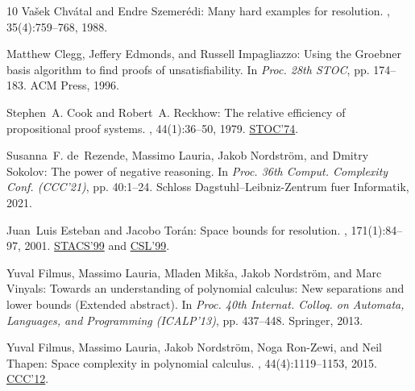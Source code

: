 \begin{thebibliography}{10}
{\sc Va{\v{s}}ek Chv{\'a}tal and Endre Szemer{\'e}di}: Many hard examples for
  resolution.
, 35(4):759--768, 1988.
\newblock [\epfmtdoi{10.1145/48014.48016}]

{\sc Matthew Clegg, Jeffery Edmonds, and Russell Impagliazzo}: Using the
  {Groebner} basis algorithm to find proofs of unsatisfiability.
\newblock In {\em Proc. 28th STOC}, pp. 174--183. ACM Press, 1996.
\newblock [\epfmtdoi{10.1145/237814.237860}]

{\sc Stephen~A. Cook and Robert~A. Reckhow}: The relative efficiency of
  propositional proof systems.
, 44(1):36--50, 1979.
\newblock \prelim \href{https://dl.acm.org/doi/10.1145/800119.803893}{STOC'74}.
\newblock [\epfmtdoi{10.2307/2273702}]

{\sc Susanna~F. de~Rezende, Massimo Lauria, Jakob Nordstr\"om, and Dmitry
  Sokolov}: The power of negative reasoning.
\newblock In {\em Proc. 36th Comput. Complexity Conf. (CCC'21)}, pp. 40:1--24.
  Schloss Dagstuhl--Leibniz-Zentrum fuer Informatik, 2021.

{\sc Juan~Luis Esteban and Jacobo Tor\'an}: Space bounds for resolution.
, 171(1):84--97, 2001.
\newblock \prelim \href{https://doi.org/10.1007/3-540-49116-3\_52}{STACS'99}
  and \href{https://doi.org/10.1007/3-540-48168-0\_26}{CSL'99}.

{\sc Yuval Filmus, Massimo Lauria, Mladen Mik\v{s}a, Jakob Nordstr\"om, and
  Marc Vinyals}: Towards an understanding of polynomial calculus: {N}ew
  separations and lower bounds ({E}xtended abstract).
\newblock In {\em Proc. 40th Internat. Colloq. on Automata, Languages, and
  Programming (ICALP'13)}, pp. 437--448. Springer, 2013.
\newblock [\epfmtdoi{10.1007/978-3-642-39206-1\_37}]

{\sc Yuval Filmus, Massimo Lauria, Jakob Nordström, Noga Ron-Zewi, and Neil
  Thapen}: Space complexity in polynomial calculus.
, 44(4):1119--1153, 2015.
\newblock \prelim \href{https://doi.org/10.1109/CCC.2012.27}{CCC'12}.
\newblock [\epfmtdoi{10.1137/120895950}]


\end{thebibliography}
